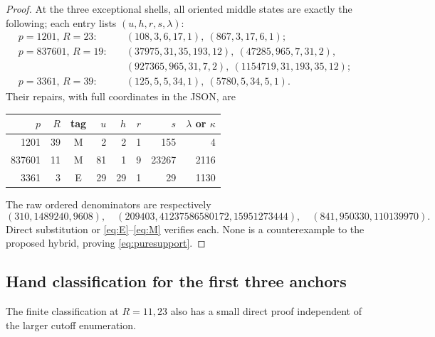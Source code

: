 \documentclass[11pt]{article}
\theoremstyle{definition}\newtheorem{definition}[theorem]{Definition}
\theoremstyle{remark}\newtheorem{remark}[theorem]{Remark}
\begin{document}
\begin{proof}
At the three exceptional shells, all oriented middle states are exactly the following; each entry lists $(u,h,r,s,\lambda)$:
\begin{align*}
 p=1201,\,R=23:&\quad (108,3,6,17,1),\ (867,3,17,6,1);\\
 p=837601,\,R=19:&\quad (37975,31,35,193,12),\ (47285,965,7,31,2),\\
 &\quad (927365,965,31,7,2),\ (1154719,31,193,35,12);\\
 p=3361,\,R=39:&\quad (125,5,5,34,1),\ (5780,5,34,5,1).
\end{align*}
Their repairs, with full coordinates in the JSON, are
\begin{center}
\begin{tabular}{rrcrrrrr}
\toprule
$p$&$R$&tag&$u$&$h$&$r$&$s$&$\lambda$ or $\kappa$\\
\midrule
1201&39&M&2&2&1&155&4\\
837601&11&M&81&1&9&23267&2116\\
3361&3&E&29&29&1&29&1130\\
\bottomrule
\end{tabular}
\end{center}
The raw ordered denominators are respectively
\[
 (310,1489240,9608),\quad
 (209403,41237586580172,15951273444),\quad
 (841,950330,110139970).
\]
Direct substitution or \eqref{eq:E}--\eqref{eq:M} verifies each. None is a counterexample to the proposed hybrid, proving \eqref{eq:puresupport}.
\end{proof}

\subsection{Hand classification for the first three anchors}
The finite classification at $R=11,23$ also has a small direct proof independent of the larger cutoff enumeration.
\end{document}
